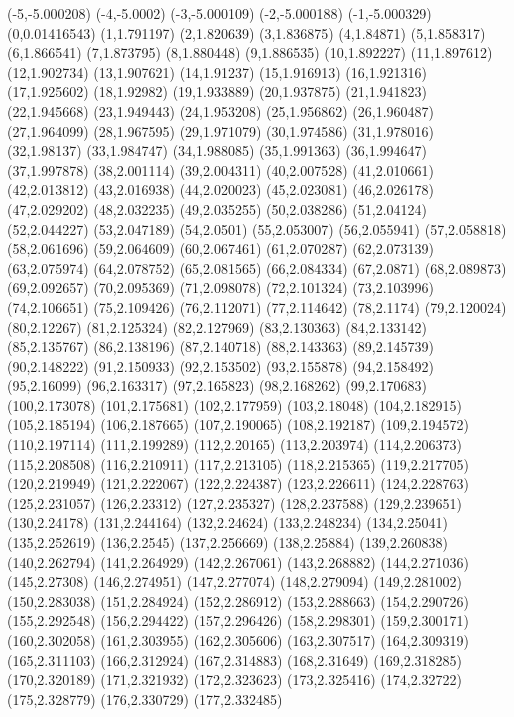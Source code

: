 (-5,-5.000208)
(-4,-5.0002)
(-3,-5.000109)
(-2,-5.000188)
(-1,-5.000329)
(0,0.01416543)
(1,1.791197)
(2,1.820639)
(3,1.836875)
(4,1.84871)
(5,1.858317)
(6,1.866541)
(7,1.873795)
(8,1.880448)
(9,1.886535)
(10,1.892227)
(11,1.897612)
(12,1.902734)
(13,1.907621)
(14,1.91237)
(15,1.916913)
(16,1.921316)
(17,1.925602)
(18,1.92982)
(19,1.933889)
(20,1.937875)
(21,1.941823)
(22,1.945668)
(23,1.949443)
(24,1.953208)
(25,1.956862)
(26,1.960487)
(27,1.964099)
(28,1.967595)
(29,1.971079)
(30,1.974586)
(31,1.978016)
(32,1.98137)
(33,1.984747)
(34,1.988085)
(35,1.991363)
(36,1.994647)
(37,1.997878)
(38,2.001114)
(39,2.004311)
(40,2.007528)
(41,2.010661)
(42,2.013812)
(43,2.016938)
(44,2.020023)
(45,2.023081)
(46,2.026178)
(47,2.029202)
(48,2.032235)
(49,2.035255)
(50,2.038286)
(51,2.04124)
(52,2.044227)
(53,2.047189)
(54,2.0501)
(55,2.053007)
(56,2.055941)
(57,2.058818)
(58,2.061696)
(59,2.064609)
(60,2.067461)
(61,2.070287)
(62,2.073139)
(63,2.075974)
(64,2.078752)
(65,2.081565)
(66,2.084334)
(67,2.0871)
(68,2.089873)
(69,2.092657)
(70,2.095369)
(71,2.098078)
(72,2.101324)
(73,2.103996)
(74,2.106651)
(75,2.109426)
(76,2.112071)
(77,2.114642)
(78,2.1174)
(79,2.120024)
(80,2.12267)
(81,2.125324)
(82,2.127969)
(83,2.130363)
(84,2.133142)
(85,2.135767)
(86,2.138196)
(87,2.140718)
(88,2.143363)
(89,2.145739)
(90,2.148222)
(91,2.150933)
(92,2.153502)
(93,2.155878)
(94,2.158492)
(95,2.16099)
(96,2.163317)
(97,2.165823)
(98,2.168262)
(99,2.170683)
(100,2.173078)
(101,2.175681)
(102,2.177959)
(103,2.18048)
(104,2.182915)
(105,2.185194)
(106,2.187665)
(107,2.190065)
(108,2.192187)
(109,2.194572)
(110,2.197114)
(111,2.199289)
(112,2.20165)
(113,2.203974)
(114,2.206373)
(115,2.208508)
(116,2.210911)
(117,2.213105)
(118,2.215365)
(119,2.217705)
(120,2.219949)
(121,2.222067)
(122,2.224387)
(123,2.226611)
(124,2.228763)
(125,2.231057)
(126,2.23312)
(127,2.235327)
(128,2.237588)
(129,2.239651)
(130,2.24178)
(131,2.244164)
(132,2.24624)
(133,2.248234)
(134,2.25041)
(135,2.252619)
(136,2.2545)
(137,2.256669)
(138,2.25884)
(139,2.260838)
(140,2.262794)
(141,2.264929)
(142,2.267061)
(143,2.268882)
(144,2.271036)
(145,2.27308)
(146,2.274951)
(147,2.277074)
(148,2.279094)
(149,2.281002)
(150,2.283038)
(151,2.284924)
(152,2.286912)
(153,2.288663)
(154,2.290726)
(155,2.292548)
(156,2.294422)
(157,2.296426)
(158,2.298301)
(159,2.300171)
(160,2.302058)
(161,2.303955)
(162,2.305606)
(163,2.307517)
(164,2.309319)
(165,2.311103)
(166,2.312924)
(167,2.314883)
(168,2.31649)
(169,2.318285)
(170,2.320189)
(171,2.321932)
(172,2.323623)
(173,2.325416)
(174,2.32722)
(175,2.328779)
(176,2.330729)
(177,2.332485)
